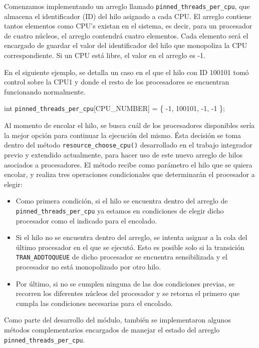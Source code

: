 Comenzamos implementando un arreglo llamado \verb|pinned_threads_per_cpu|, que almacena el identificador (ID) del hilo asignado a cada CPU. El arreglo contiene tantos elementos como CPU's existan en el sistema, es decir, para un procesador de cuatro núcleos, el arreglo contendrá cuatro elementos. Cada elemento será el encargado de guardar el valor del identificador del hilo que monopoliza la CPU correspondiente.  Si un CPU está libre, el valor en el arreglo es -1.

En el siguiente ejemplo, se detalla un caso en el que el hilo con ID 100101 tomó control sobre la CPU1 y donde el resto de los procesadores se encuentran funcionando normalmente.

int \verb|pinned_threads_per_cpu|[CPU\_NUMBER] = \{ -1, 100101, -1, -1 \};

Al momento de encolar el hilo, se busca cuál de los procesadores disponibles sería la mejor opción para continuar la ejecución del mismo. Ésta decisión se toma dentro del método \verb|resource_choose_cpu()| desarrollado en el trabajo integrador previo y extendido actualmente, para hacer uso de este nuevo arreglo de hilos asociados a procesadores. El método recibe como parámetro el hilo que se quiera encolar, y realiza tres operaciones condicionales que determinarán el procesador a elegir:

\begin{itemize}
    \item Como primera condición, si el hilo se encuentra dentro del arreglo de \verb|pinned_threads_per_cpu| ya estamos en condiciones de elegir dicho procesador como el indicado para el encolado.
    \item Si el hilo no se encuentra dentro del arreglo, se intenta asignar a la cola del último procesador en el que se ejecutó. Esto es posible solo si la transición \verb|TRAN_ADDTOQUEUE| de dicho procesador se encuentra sensibilizada y el procesador no está monopolizado por otro hilo.
    \item Por último, si no se cumplen ninguna de las dos condiciones previas, se recorren los diferentes núcleos del procesador y se retorna el primero que cumpla las condiciones necesarias para el encolado.
\end{itemize}

Como parte del desarrollo del módulo, también se implementaron algunos métodos complementarios encargados de manejar el estado del arreglo \verb|pinned_threads_per_cpu|.

